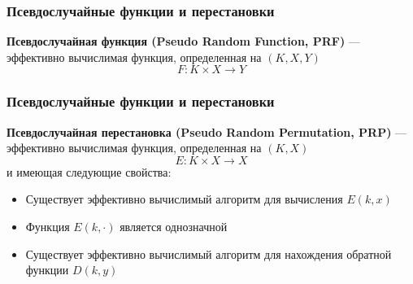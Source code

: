 \documentclass{beamer}
\newcommand{\define}[2]{{\bf #1} --- #2\vspace{1em}}
\begin{document}
\begin{frame}
  \frametitle{Псевдослучайные функции и перестановки}

  \define{Псевдослучайная функция (Pseudo Random Function, PRF)}
    {эффективно вычислимая функция, определенная на $(K,X,Y)$ \newline
    \[F: K \times X \rightarrow Y\]}

\end{frame}


\begin{frame}
  \frametitle{Псевдослучайные функции и перестановки}

  \define{Псевдослучайная перестановка (Pseudo Random Permutation, PRP)}
    {эффективно вычислимая функция, определенная на $(K,X)$ \newline
    \[E: K \times X \rightarrow X\]
    и имеющая следующие свойства:

    \begin{itemize}
      \item{Существует эффективно вычислимый алгоритм для вычисления $E(k,x)$}
      \item{Функция $E(k,\cdot)$ является однозначной}
      \item{Существует эффективно вычислимый алгоритм для нахождения обратной функции $D(k,y)$}
    \end{itemize}
  }


\end{frame}
\end{document}
